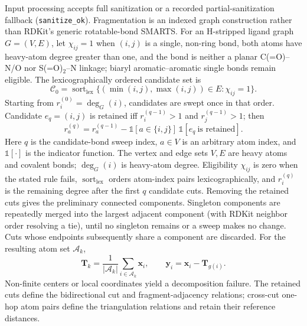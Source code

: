 \documentclass{article}
\begin{document}
Input processing accepts full sanitization or a recorded partial-sanitization fallback (\texttt{sanitize\_ok}).
Fragmentation is an indexed graph construction rather than RDKit's generic rotatable-bond SMARTS.
For an H-stripped ligand graph \(G=(V,E)\), let \(\chi_{ij}=1\) when \((i,j)\) is a single, non-ring bond, both atoms have heavy-atom degree greater than one, and the bond is neither a planar C(=O)--N/O nor S(=O)$_2$--N linkage; biaryl aromatic--aromatic single bonds remain eligible.  The lexicographically ordered candidate set is
\begin{equation}
    \mathcal{C}_0=
    \operatorname{sort}_{\mathrm{lex}}
    \{(\min(i,j),\max(i,j))\in E:\chi_{ij}=1\}.
    \label{eq:si_fragment_candidates}
\end{equation}
Starting from \(r_i^{(0)}=\deg_G(i)\), candidates are swept once in that order.  Candidate \(e_q=(i,j)\) is retained iff \(r_i^{(q-1)}>1\) and \(r_j^{(q-1)}>1\); then
\begin{equation}
    r_a^{(q)}=r_a^{(q-1)}
    -\mathbb{1}[a\in\{i,j\}]\,
     \mathbb{1}[e_q\ \text{is retained}].
    \label{eq:si_fragment_degree_sweep}
\end{equation}
Here \(q\) is the candidate-bond sweep index, \(a\in V\) is an arbitrary atom index, and \(\mathbb 1[\cdot]\) is the indicator function. The vertex and edge sets \(V,E\) are heavy atoms and covalent bonds; \(\deg_G(i)\) is heavy-atom degree. Eligibility \(\chi_{ij}\) is zero when the stated rule fails, \(\operatorname{sort}_{\mathrm{lex}}\) orders atom-index pairs lexicographically, and \(r_i^{(q)}\) is the remaining degree after the first \(q\) candidate cuts.
Removing the retained cuts gives the preliminary connected components.  Singleton components are repeatedly merged into the largest adjacent component (with RDKit neighbor order resolving a tie), until no singleton remains or a sweep makes no change.  Cuts whose endpoints subsequently share a component are discarded.  For the resulting atom set \(\mathcal{A}_k\),
\begin{equation}
    \mathbf{T}_k=\frac{1}{|\mathcal{A}_k|}
      \sum_{i\in\mathcal{A}_k}\mathbf{x}_i,
    \qquad
    \mathbf{y}_i=\mathbf{x}_i-\mathbf{T}_{g(i)}.
    \label{eq:si_fragment_local_coordinates}
\end{equation}
Non-finite centers or local coordinates yield a decomposition failure.  The retained cuts define the bidirectional cut and fragment-adjacency relations; cross-cut one-hop atom pairs define the triangulation relations and retain their reference distances.
\end{document}
